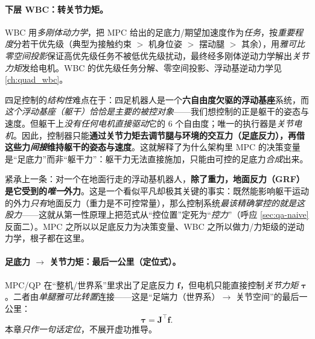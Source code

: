 \paragraph{下层 WBC：转关节力矩。}
WBC 用\emph{多刚体动力学}，把 MPC 给出的足底力/期望加速度作为\emph{任务}，按\emph{重要程度}分若干优先级（典型为接触约束 $>$ 机身位姿 $>$ 摆动腿 $>$ 其余），用\emph{雅可比零空间投影}保证高优先级任务不被低优先级扰动，最终经多刚体逆动力学解出\emph{关节力矩}发给电机。WBC 的优先级任务分解、零空间投影、浮动基逆动力学见 \cref{ch:quad_wbc}。

\begin{insight}\label{ins:qa-floating-base}
四足控制的\emph{结构性}难点在于：四足机器人是一个\textbf{六自由度欠驱的浮动基座}系统，而\emph{这个浮动基座（躯干）恰恰是主要的被控对象}——我们想控制的正是躯干的姿态与速度。但躯干上\emph{没有任何电机直接驱动}它的 $6$ 个自由度；唯一的执行器是\emph{关节电机}。因此，控制器只能\textbf{通过关节力矩去调节腿与环境的交互力（足底反力），再借这些力\emph{间接}维持躯干的姿态与速度}\cite{yu2021quadruped}。这就解释了为什么架构里 MPC 的决策变量是“足底力”而非“躯干力”：躯干力无法直接施加，只能由可控的足底力\emph{合成}出来。
\end{insight}

\begin{insight}\label{ins:qa-grf-only}
紧承上一条：对一个在地面行走的浮动基机器人，\textbf{除了重力，地面反力（GRF）是它受到的\emph{唯一}外力}\cite{yu2021quadruped}。这是一个看似平凡却极其关键的事实：既然能影响躯干运动的外力\emph{只有}地面反力（重力是不可控常量），那么控制系统\emph{最该精确掌控的就是这股力}——这就从第一性原理上把范式从“控位置”定死为“\emph{控力}”（呼应 \cref{sec:qa-naive} 反面二）。MPC 之所以以足底反力为决策变量、WBC 之所以做力/力矩级的逆动力学，根子都在这里。
\end{insight}

\paragraph{足底力 $\to$ 关节力矩：最后一公里（定位式）。}
MPC/QP 在“整机/世界系”里求出了足底反力 $\mathbf{f}$，但电机只能直接控制\emph{关节力矩} $\boldsymbol\tau$。二者由\emph{单腿雅可比转置}连接——这是“足端力（世界系）$\to$ 关节空间”的最后一公里：
\begin{equation}
  \boldsymbol\tau=\mathbf{J}^\top\mathbf{f}.
  \label{eq:qa-jtf}
\end{equation}
本章\emph{只作一句话定位}，不展开虚功推导。

